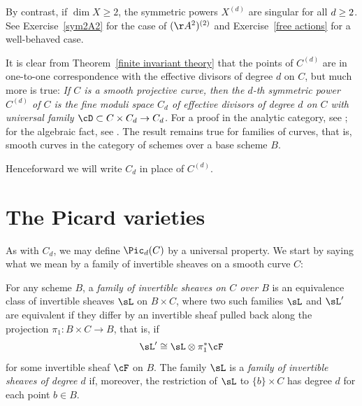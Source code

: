 By contrast, if $\dim X \geq 2$, the symmetric powers $X^{(d)}$ are
singular for all $d \geq \nobreak 2$.
See Exercise~\ref{sym2A2} for the case of $(\AA^2)^{(2)}$ and Exercise~\ref{free actions} for a well-behaved case.
\vspace{3pt}

\begin{fact}\label{universal property of symmetric power}
It is clear from Theorem~\ref{finite invariant theory} that the points
of $C^{(d)}$ are in one-to-one correspondence with the effective
divisors of degree $d$ on $C$, but much more is true: 
\smallbreak
{\it
If $C$ is a smooth projective curve, then the $d$-th 
symmetric power
%
$C^{(d)}$ of $C$ is the 
fine moduli space 
%
$C_d$ of effective divisors of degree $d$ on $C$ with 
universal family
%
%
$\cD\subset C\times C_d \to C_d$.
}
\smallbreak
For a proof in the analytic category, see \cite[p.\,164]{ACGH}; 
for the algebraic fact, see \cite[Remark 9.3.9]{Kleiman-PicardScheme}. 
The result remains true for 
families of curves,
%
 that is, smooth curves in
the category of schemes over a base scheme $B$.
\end{fact}

Henceforward we will write $C_d$ in place of $C^{(d)}$.

\section{The Picard varieties}\label{Picard section}

As with $C_d$, we may define $\Pic_d(C)$ by a universal property. We start by saying what we mean by a family of invertible sheaves on a smooth curve $C$:

\begin{definition}
For any scheme $B$, a \emph{family of invertible sheaves on $C$ over $B$} 
%
is an equivalence class of invertible sheaves $\sL$ on $B\times C$, 
where two such
 families $\sL$ and $\sL'$ are equivalent if they differ by an invertible sheaf pulled back along the projection $\pi_1: B\times C \to B$, that is, if
 $$
 \sL' \cong \sL \otimes \pi_1^*\cF
 $$
for some invertible sheaf $\cF$ on $B$.
The family $\sL$  is a \emph{family of invertible sheaves of degree $d$} if, moreover, the restriction of $\sL$
 to $\{b\}\times C$ has degree $d$ for each point $b\in B$. 
 \end{definition}


